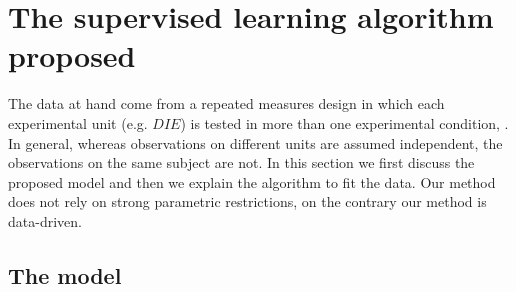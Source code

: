 \documentclass[sn-mathphys]{sn-jnl}%
\theoremstyle{thmstyleone}%
\theoremstyle{thmstyletwo}%
\theoremstyle{thmstylethree}%
\begin{document}
\section{The supervised learning algorithm proposed}\label{sec:model}


\noindent The data at hand come from a repeated measures design in which each experimental unit (e.g. $DIE$) is tested in more than one experimental condition, \cite{BHN2000}. In general, whereas observations on different units are assumed independent, the observations on the same subject are not. %
In this section we first discuss the proposed model and then we explain the algorithm to fit the data. Our method does not rely on strong parametric restrictions, on the contrary our method is data-driven. 
%

\subsection{The model}
\end{document}
